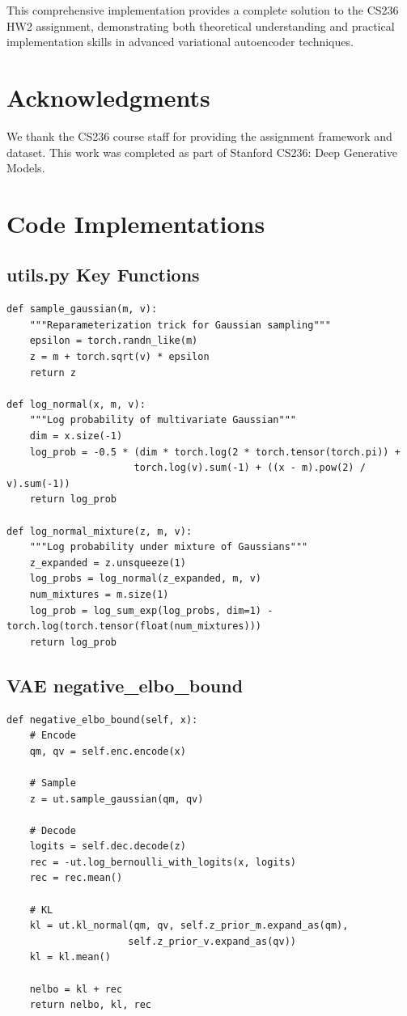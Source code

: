 \documentclass{article}
\begin{document}
This comprehensive implementation provides a complete solution to the CS236 HW2 assignment, demonstrating both theoretical understanding and practical implementation skills in advanced variational autoencoder techniques.

\section*{Acknowledgments}

We thank the CS236 course staff for providing the assignment framework and dataset. This work was completed as part of Stanford CS236: Deep Generative Models.




\appendix

\section{Code Implementations}

\subsection{utils.py Key Functions}

\begin{verbatim}
def sample_gaussian(m, v):
    """Reparameterization trick for Gaussian sampling"""
    epsilon = torch.randn_like(m)
    z = m + torch.sqrt(v) * epsilon
    return z

def log_normal(x, m, v):
    """Log probability of multivariate Gaussian"""
    dim = x.size(-1)
    log_prob = -0.5 * (dim * torch.log(2 * torch.tensor(torch.pi)) +
                      torch.log(v).sum(-1) + ((x - m).pow(2) / v).sum(-1))
    return log_prob

def log_normal_mixture(z, m, v):
    """Log probability under mixture of Gaussians"""
    z_expanded = z.unsqueeze(1)
    log_probs = log_normal(z_expanded, m, v)
    num_mixtures = m.size(1)
    log_prob = log_sum_exp(log_probs, dim=1) - torch.log(torch.tensor(float(num_mixtures)))
    return log_prob
\end{verbatim}

\subsection{VAE negative_elbo_bound}

\begin{verbatim}
def negative_elbo_bound(self, x):
    # Encode
    qm, qv = self.enc.encode(x)

    # Sample
    z = ut.sample_gaussian(qm, qv)

    # Decode
    logits = self.dec.decode(z)
    rec = -ut.log_bernoulli_with_logits(x, logits)
    rec = rec.mean()

    # KL
    kl = ut.kl_normal(qm, qv, self.z_prior_m.expand_as(qm),
                     self.z_prior_v.expand_as(qv))
    kl = kl.mean()

    nelbo = kl + rec
    return nelbo, kl, rec
\end{verbatim}
\end{document}
